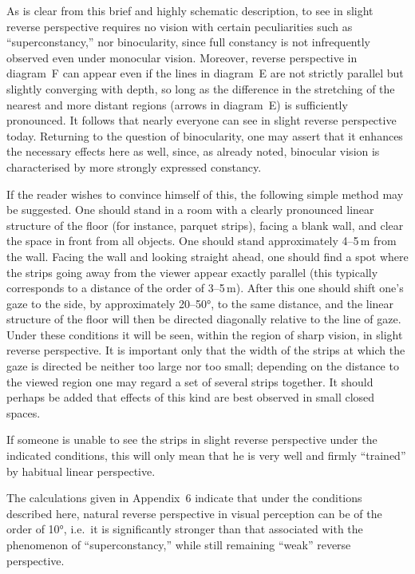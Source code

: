 As is clear from this brief and highly schematic description, to see in slight
reverse perspective requires no vision with certain peculiarities such as
``superconstancy,'' nor binocularity, since full constancy is not infrequently
observed even under monocular vision.  Moreover, reverse perspective in diagram~F can
appear even if the lines in diagram~E are not strictly parallel but slightly
converging with depth, so long as the difference in the stretching of the nearest and
more distant regions (arrows in diagram~E) is sufficiently pronounced.  It follows
that nearly everyone can see in slight reverse perspective today.  Returning to the
question of binocularity, one may assert that it enhances the necessary effects here
as well, since, as already noted, binocular vision is characterised by more strongly
expressed constancy.

If the reader wishes to convince himself of this, the following simple method may be
suggested.  One should stand in a room with a clearly pronounced linear structure of
the floor (for instance, parquet strips), facing a blank wall, and clear the space in
front from all objects.  One should stand approximately 4--5\,m from the wall.
Facing the wall and looking straight ahead, one should find a spot where the strips
going away from the viewer appear exactly parallel (this typically corresponds to a
distance of the order of 3--5\,m).  After this one should shift one's gaze to the
side, by approximately 20--50°, to the same distance, and the linear structure of
the floor will then be directed diagonally relative to the line of gaze.  Under
these conditions it will be seen, within the region of sharp vision, in slight
reverse perspective.  It is important only that the width of the strips at which the
gaze is directed be neither too large nor too small; depending on the distance to the
viewed region one may regard a set of several strips together.  It should perhaps be
added that effects of this kind are best observed in small closed spaces.

If someone is unable to see the strips in slight reverse perspective under the
indicated conditions, this will only mean that he is very well and firmly ``trained''
by habitual linear perspective.

The calculations given in Appendix~6 indicate that under the conditions described
here, natural reverse perspective in visual perception can be of the order of 10°,
i.e.\ it is significantly stronger than that associated with the phenomenon of
``superconstancy,'' while still remaining ``weak'' reverse perspective.

